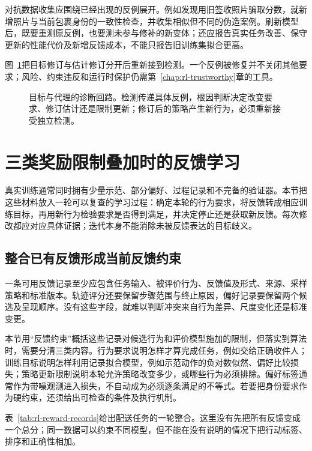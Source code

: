 对抗数据收集应围绕已经出现的反例展开。例如发现用旧签收照片骗取分数，就新增照片与当前包裹身份的一致性检查，并收集相似但不同的伪造案例。刷新模型后，既要重测原反例，也要测未参与修补的新变体；还应报告真实任务改善、保守更新的性能代价及新增反馈成本，不能只报告旧训练集拟合更高。

图~\ref{fig:rl-reward-revision}把目标修订与估计修订分开后重新接到检测。一个反例被修复并不关闭其他要求；风险、约束违反和运行时保护仍需第~\ref{chap:rl-trustworthy}章的工具。

\begin{figure}[htbp]
  \centering
  
  \caption{目标与代理的诊断回路。检测传递具体反例，根因判断决定改变要求、修订估计还是限制更新；修订后的策略产生新行为，必须重新接受独立检测。}
  \label{fig:rl-reward-revision}
\end{figure}

\section{三类奖励限制叠加时的反馈学习}
\label{sec:rl-reward-loop}

真实训练通常同时拥有少量示范、部分偏好、过程记录和不完备的验证器。本节把这些材料放入一轮可以复查的学习过程：确定本轮的行为要求，将反馈转成相应训练目标，再用新行为检验要求是否得到满足，并决定停止还是获取新反馈。每次修改都应对应具体证据；迭代本身不能消除未被反馈表达的目标歧义。

\subsection{整合已有反馈形成当前反馈约束}
\label{sec:rl-reward-integration}

一条可用反馈记录至少应包含任务输入、被评价行为、反馈值及形式、来源、采样策略和标准版本。轨迹评分还要保留步骤范围与终止原因，偏好记录要保留两个候选及呈现顺序。没有这些字段，就难以判断冲突来自行为差异、尺度变化还是标准变更。

本节用“反馈约束”概括这些记录对候选行为和评价模型施加的限制，但落实到算法时，需要分清三类内容。行为要求说明怎样才算完成任务，例如交给正确收件人；训练目标说明怎样利用记录拟合模型，例如示范动作的负对数似然、偏好比较损失；策略更新限制说明本轮允许策略改变多少，或哪些行为必须排除。偏好标签通常作为带噪观测进入损失，不自动成为必须逐条满足的不等式。若要把身份要求作为硬约束，还须给出可检查的条件及执行机制。

表~\ref{tab:rl-reward-records}给出配送任务的一轮整合。这里没有先把所有反馈变成一个总分；同一数据可以约束不同模型，但不能在没有说明的情况下把行动标签、排序和正确性相加。

